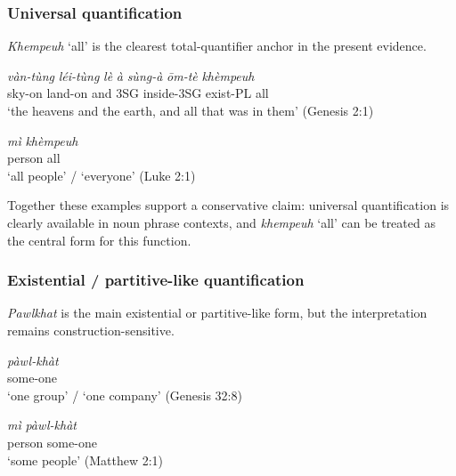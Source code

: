 \documentclass[
  11pt,
  a4paper,
]{article}
\newcommand{\tdim}[1]{\textit{#1}}
\newcommand{\tdimword}[1]{\textit{#1}}
\renewcommand{\textsc}[1]{{\footnotesize\MakeUppercase{#1}}}
\newcommand{\glossquote}[1]{`#1'}
\begin{document}
\subsubsection{Universal quantification}\label{universal-quantification}

\tdim{Khempeuh} \glossquote{all} is the clearest total-quantifier anchor
in the present evidence.

\begin{exe}
\ex \label{ex:quant-khempeuh}
\gll \tdimword{vàn-tùng} \tdimword{léi-tùng} \tdimword{lè} \tdimword{à} \tdimword{sùng-à} \tdimword{ōm-tè} \tdimword{khèmpeuh} \\
     sky-on land-on and \textsc{3sg} inside-\textsc{3sg} exist-\textsc{pl} all \\
\glt \glossquote{the heavens and the earth, and all that was in them} (Genesis 2:1)
\end{exe}

\begin{exe}
\ex \label{ex:quant-mi-khempeuh}
\gll \tdimword{mì} \tdimword{khèmpeuh} \\
     person all \\
\glt \glossquote{all people} / \glossquote{everyone} (Luke 2:1)
\end{exe}

Together these examples support a conservative claim: universal
quantification is clearly available in noun phrase contexts, and
\tdim{khempeuh} \glossquote{all} can be treated as the central form for
this function.

\subsubsection{Existential / partitive-like
quantification}\label{existential-partitive-like-quantification}

\tdim{Pawlkhat} is the main existential or partitive-like form, but the
interpretation remains construction-sensitive.

\begin{exe}
\ex \label{ex:quant-pawlkhat}
\gll \tdimword{pàwl-khàt} \\
     some-one \\
\glt \glossquote{one group} / \glossquote{one company} (Genesis 32:8)
\end{exe}

\begin{exe}
\ex \label{ex:quant-mi-pawlkhat}
\gll \tdimword{mì} \tdimword{pàwl-khàt} \\
     person some-one \\
\glt \glossquote{some people} (Matthew 2:1)
\end{exe}
\end{document}
